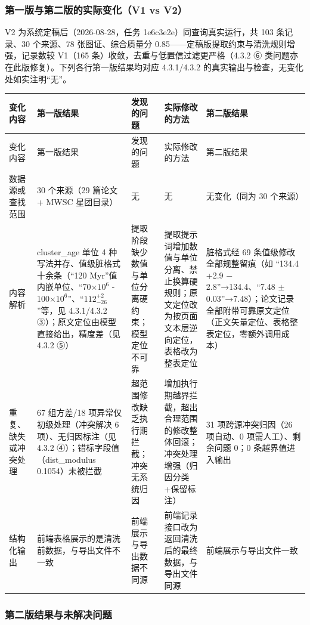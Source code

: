 \subsubsection{第一版与第二版的实际变化（V1 vs V2）}

V2 为系统定稿后（2026-08-28，任务 1e6c3e2e）同查询真实运行，共 103 条记录、30 个来源、78 张图证、综合质量分 0.85——定稿版提取约束与清洗规则增强，记录数较 V1（165 条）收敛，去重与低置信过滤更严格（4.3.2 ⑥ 类问题亦在此版修复）。下列各行第一版结果均对应 4.3.1/4.3.2 的真实输出与检查，无变化处如实注明“无”。

\begin{longtable}{@{}p{1.8cm}p{3.6cm}p{2.4cm}p{3.5cm}p{3.2cm}@{}}
\toprule
变化内容 & 第一版结果 & 发现的问题 & 实际修改的方法 & 第二版结果 \\
\midrule
\endfirsthead
\toprule
变化内容 & 第一版结果 & 发现的问题 & 实际修改的方法 & 第二版结果 \\
\midrule
\endhead
数据源或查找范围 & 30 个来源（29 篇论文 + MWSC 星团目录） & 无 & 无 & 无变化（同为 30 个来源） \\
内容解析 & cluster\_age 单位 4 种写法并存、值级脏格式十余条（“120 Myr”值内嵌单位、“70$\times10^{6}$ - 100$\times10^{6}$”、“$112^{+2}_{-26}$”等，见 4.3.1/4.3.2 ③）；原文定位由模型直接给出，精度差（见 4.3.2 ⑤） & 提取阶段缺少数值与单位分离硬约束；模型定位不可靠 & 提取提示词增加数值与单位分离、禁止换算硬规则；原文定位改为按页面文本层逆向定位，表格改为整表定位 & 脏格式经 69 条值级修改全部规整留痕（如 “134.4 +2.9 $-$2.8”→134.4、“7.48 $\pm$ 0.03”→7.48）；论文记录全部附带可靠原文定位（正文矢量定位、表格整表定位，零额外调用成本） \\
重复、缺失或冲突处理 & 67 组方差/18 项异常仅初级处理（冲突解决 6 项）、无归因标注（见 4.3.2 ④）；错标字段值（dist\_modulus 0.1054）未被拦截 & 超范围修改缺乏执行期拦截；冲突无系统归因 & 增加执行期越界拦截，超出合理范围的修改整体回滚；冲突处理增强（归因分类+保留标注） & 31 项跨源冲突归因（26 项自动、0 项需人工）、剩余问题 0；0 条越界值进入输出 \\
结构化输出 & 前端表格展示的是清洗前数据，与导出文件不一致 & 前端展示与导出数据不同源 & 前端记录接口改为返回清洗后的最终数据，与导出文件同源 & 前端展示与导出文件一致 \\
\bottomrule
\end{longtable}

\subsubsection{第二版结果与未解决问题}

